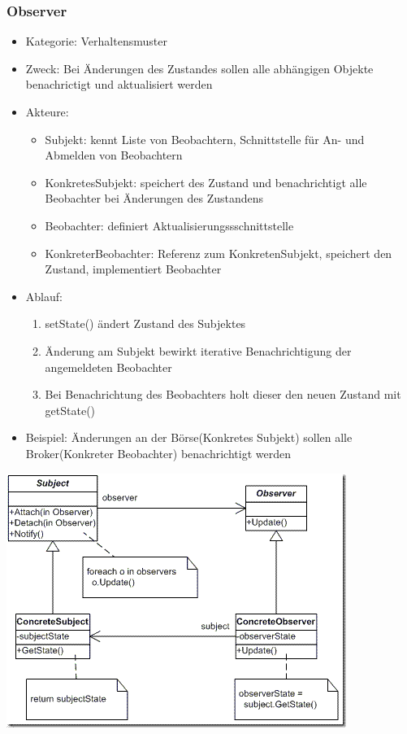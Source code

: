 \documentclass[11pt, fleqn, a4paper, leqno]{scrartcl} %
\begin{document}
		\subsubsection{Observer}
			\begin{itemize}
				\item Kategorie: Verhaltensmuster
				\item Zweck: Bei Änderungen des Zustandes sollen alle abhängigen Objekte benachrictigt und aktualisiert werden 
				\item Akteure:
					\begin{itemize}
						\item Subjekt: kennt Liste von Beobachtern, Schnittstelle für An- und Abmelden von Beobachtern
						\item KonkretesSubjekt: speichert des Zustand und benachrichtigt alle Beobachter bei Änderungen des Zustandens
						\item Beobachter: definiert Aktualisierungssschnittstelle
						\item KonkreterBeobachter: Referenz zum KonkretenSubjekt, speichert den Zustand, implementiert Beobachter
					\end{itemize}

				\item Ablauf:
					\begin{enumerate}
						\item  setState() ändert Zustand des Subjektes
						\item Änderung am Subjekt bewirkt iterative Benachrichtigung der angemeldeten Beobachter
						\item Bei Benachrichtung des Beobachters holt dieser den neuen Zustand mit getState()
					\end{enumerate}
				\item Beispiel: Änderungen an der Börse(Konkretes Subjekt) sollen alle Broker(Konkreter Beobachter) benachrichtigt werden
			\end{itemize}
			\includegraphics[scale=0.5]{images/observer.png}
		\newpage
\end{document}
